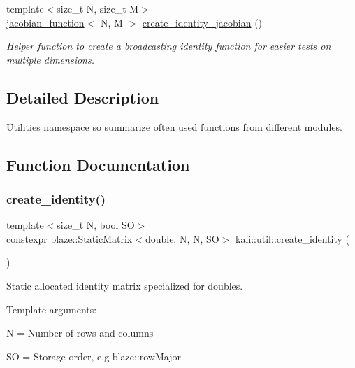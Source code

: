 \begin{DoxyCompactItemize}
{\footnotesize template$<$size\+\_\+t N, size\+\_\+t M$>$ }\\\hyperlink{classkafi_1_1jacobian__function}{jacobian\+\_\+function}$<$ N, M $>$ \hyperlink{namespacekafi_1_1util_a82e8f22857719d09437ce64e90c4b457}{create\+\_\+identity\+\_\+jacobian} ()
\begin{DoxyCompactList}\small\item\em Helper function to create a broadcasting identity function for easier tests on multiple dimensions. \end{DoxyCompactList}\end{DoxyCompactItemize}


\subsection{Detailed Description}
Utilities namespace so summarize often used functions from different modules. 



\subsection{Function Documentation}
\mbox{\label{namespacekafi_1_1util_adebb31ac70499385be7e7693e9c73453}} 
\subsubsection{\texorpdfstring{create\+\_\+identity()}{create\_identity()}}
{\footnotesize\ttfamily template$<$size\+\_\+t N, bool SO$>$ \\
constexpr blaze\+::\+Static\+Matrix$<$double, N, N, SO$>$ kafi\+::util\+::create\+\_\+identity (\begin{DoxyParamCaption}{ }\end{DoxyParamCaption})}



Static allocated identity matrix specialized for doubles. 

Template arguments\+:
\begin{DoxyItemize}
\item {\ttfamily N} = Number of rows and columns
\item {\ttfamily SO} = Storage order, e.\+g {\ttfamily blaze\+::row\+Major}
\end{DoxyItemize}

